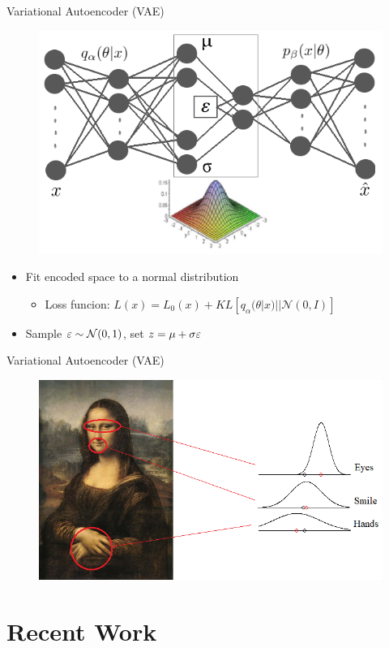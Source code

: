 \documentclass{beamer}
\def \e{\ensuremath \varepsilon}
\theoremstyle{definition}
\begin{document}
\begin{frame}{Variational Autoencoder (VAE)}
\begin{figure}
\includegraphics[width=.7\textwidth]{img/basic_vae.png}
\end{figure}
\begin{itemize}
  \item<1-> Fit encoded space to a normal distribution
  \begin{itemize}
    \item<1-> Loss funcion: $L(x) = L_0(x) + KL[q_\alpha(\theta | x) || \mathcal{N}(0,I)] $
  \end{itemize}
  \item<2-> Sample $\e \sim \mathcal{N}(0,1)$, set $z = \mu + \sigma \e$
\end{itemize}
\end{frame}

\begin{frame}{Variational Autoencoder (VAE)}
\begin{figure}
\includegraphics[width=.8\textwidth]{img/vae_dist/combined.png}
\end{figure}
\end{frame}


\section{Recent Work}
\end{document}
